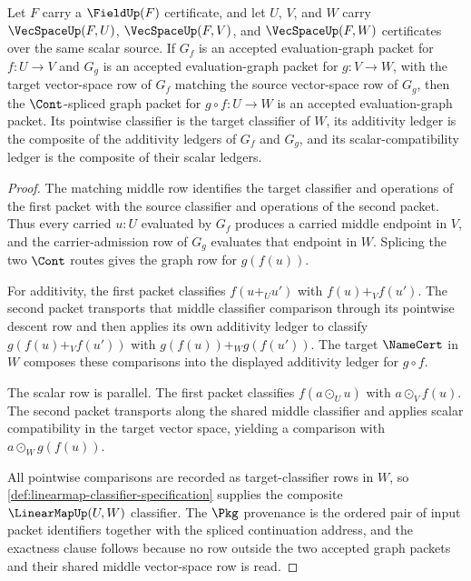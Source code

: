 \begin{theorem}
\label{thm:linearmap-evaluation-graph-composition-closure}
Let $F$ carry a $\FieldUp(F)$ certificate, and let $U$, $V$, and $W$ carry $\VecSpaceUp(F,U)$, $\VecSpaceUp(F,V)$, and $\VecSpaceUp(F,W)$ certificates over the same scalar source. If $G_f$ is an accepted evaluation-graph packet for $f:U\to V$ and $G_g$ is an accepted evaluation-graph packet for $g:V\to W$, with the target vector-space row of $G_f$ matching the source vector-space row of $G_g$, then the $\Cont$-spliced graph packet for $g\circ f:U\to W$ is an accepted evaluation-graph packet. Its pointwise classifier is the target classifier of $W$, its additivity ledger is the composite of the additivity ledgers of $G_f$ and $G_g$, and its scalar-compatibility ledger is the composite of their scalar ledgers.
\end{theorem}
\begin{proof}
The matching middle row identifies the target classifier and operations of the first packet with the source classifier and operations of the second packet. Thus every carried $u:U$ evaluated by $G_f$ produces a carried middle endpoint in $V$, and the carrier-admission row of $G_g$ evaluates that endpoint in $W$. Splicing the two $\Cont$ routes gives the graph row for $g(f(u))$.

For additivity, the first packet classifies $f(u+_U u')$ with $f(u)+_V f(u')$. The second packet transports that middle classifier comparison through its pointwise descent row and then applies its own additivity ledger to classify $g(f(u)+_V f(u'))$ with $g(f(u))+_W g(f(u'))$. The target $\NameCert$ in $W$ composes these comparisons into the displayed additivity ledger for $g\circ f$.

The scalar row is parallel. The first packet classifies $f(a\odot_U u)$ with $a\odot_V f(u)$. The second packet transports along the shared middle classifier and applies scalar compatibility in the target vector space, yielding a comparison with $a\odot_W g(f(u))$.

All pointwise comparisons are recorded as target-classifier rows in $W$, so \autoref{def:linearmap-classifier-specification} supplies the composite $\LinearMapUp(U,W)$ classifier. The $\Pkg$ provenance is the ordered pair of input packet identifiers together with the spliced continuation address, and the exactness clause follows because no row outside the two accepted graph packets and their shared middle vector-space row is read.
\end{proof}


